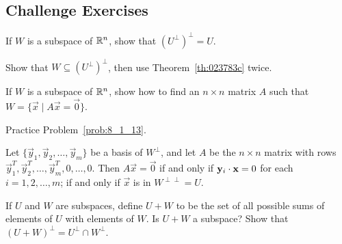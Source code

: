 \documentclass{ximera}
\begin{document}
\subsection*{Challenge Exercises}

\begin{problem}\label{prob:8_1_13}
If $W$ is a subspace of $\mathbb{R}^n$, show that $\left(U^{\perp}\right)^\perp = U$. \begin{hint}Show that $W \subseteq \left(U^{\perp}\right)^\perp$, then use Theorem~\ref{th:023783c} twice.\end{hint}
\end{problem}

\begin{problem}\label{prob:8_1_14}
If $W$ is a subspace of $\mathbb{R}^n$, show how to find an $n \times n$ matrix $A$ such that $W = \{\vec{x} \mid A\vec{x} = \vec{0}\}$. \begin{hint}Practice Problem~\ref{prob:8_1_13}.\end{hint}

\begin{hint}
Let $\{\vec{y}_{1}, \vec{y}_{2}, \dots, \vec{y}_{m}\}$ be a basis of $W^\perp$, and let $A$ be the $n \times n$ matrix with rows $\vec{y}^T_1, \vec{y}^T_2, \dots, \vec{y}^T_m, 0, \dots, 0$. Then $A\vec{x} = \vec{0}$ if and only if $\mathbf{y}_{i} \cdot \mathbf{x} = 0$ for each $i = 1, 2, \dots, m$; if and only if $\vec{x}$ is in $W^{\perp \perp} = U$.
\end{hint}
\end{problem}

\begin{problem}\label{prob:8_1_16}
If $U$ and $W$ are subspaces, define $U+W$ to be the set of all possible sums of elements of $U$ with elements of $W$.  Is $U+W$ a subspace?
Show that $(U + W)^\perp = U^\perp \cap W^\perp$. 
\end{problem}
\end{document}
